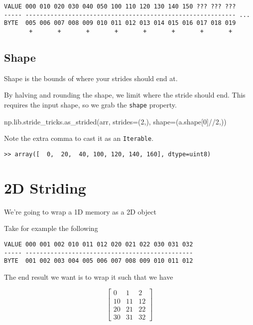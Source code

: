 \documentclass[oneside, 12pt]{report}
\begin{document}
\begin{verbatim}
VALUE 000 010 020 030 040 050 100 110 120 130 140 150 ??? ??? ??? 
----- ----------------------------------------------------------- ...
BYTE  005 006 007 008 009 010 011 012 013 014 015 016 017 018 019
       +       +       +       +       +       +       +       +
\end{verbatim}

\subsection{Shape}

Shape is the bounds of where your strides should end at.

By halving and rounding the shape, we limit where the stride should end. This requires the input shape, so we grab the \verb+shape+ property.

\begin{python}
np.lib.stride_tricks.as_strided(arr, strides=(2,), shape=(a.shape[0]//2,))
\end{python}

Note the extra comma to cast it as an \verb+Iterable+.

\begin{verbatim}
>> array([  0,  20,  40, 100, 120, 140, 160], dtype=uint8)
\end{verbatim}

\section{2D Striding}

We're going to wrap a 1D memory as a 2D object

Take for example the following

\begin{verbatim}
VALUE 000 001 002 010 011 012 020 021 022 030 031 032
----- -----------------------------------------------
BYTE  001 002 003 004 005 006 007 008 009 010 011 012
\end{verbatim}

The end result we want is to wrap it such that we have

\begin{equation*}
\begin{bmatrix}
0  & 1  & 2 \\
10 & 11 & 12 \\
20 & 21 & 22 \\
30 & 31 & 32
\end{bmatrix}
\end{equation*}
\end{document}
